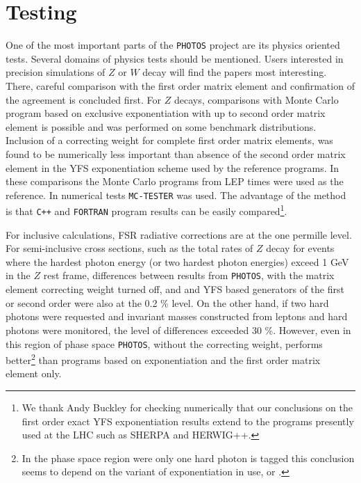 \documentclass[]{Photos_interface_design}
\begin{document}
\section{Testing}
\label{sec:tests} 
One of the most important parts of the {\tt PHOTOS} project are its physics oriented tests.
Several domains
of physics tests should be mentioned. Users interested in precision 
simulations of $Z$ or $W$ decay  will 
find  the papers \cite{Nanava:2009vg,Golonka:2006tw,Golonka:2005pn}
most interesting. There, careful comparison with the first order matrix element 
and confirmation of the agreement is concluded first.
For $Z$ decays, comparisons  with Monte Carlo program based on exclusive 
exponentiation with up to second order matrix element
is possible and was performed on some benchmark distributions.
Inclusion of a correcting weight for complete first order matrix elements, was found to be numerically less important
than absence of the second order matrix element in the YFS exponentiation scheme used by the reference programs. 
In these comparisons the Monte Carlo programs from LEP times 
\cite{koralz4:1994,kkcpc:1999} were used as the reference. In numerical tests {\tt MC-TESTER} \cite{Davidson:2008ma}
was used. The advantage of the method is that {\tt C++} and {\tt FORTRAN} program
results can be easily compared\footnote{We thank Andy Buckley for checking numerically
 that our conclusions on the first order exact YFS exponentiation results extend
to the programs presently used at the LHC such as  
SHERPA and HERWIG++.  }.
 
For inclusive calculations, FSR radiative corrections are at the one permille level.
For semi-inclusive cross sections, such as the total rates of $Z$ decay for events
where the hardest photon energy (or two hardest photon energies)   exceed 1 GeV in the $Z$ rest frame, differences
between results from {\tt PHOTOS}, with the matrix element correcting weight turned off, and
and YFS based generators of the first or second order were also 
at the 0.2 \% level. 
On the other hand, if two  hard photons were requested and invariant masses constructed from leptons
and hard photons were monitored,
 the level of differences exceeded 
 30 \%. However, even in this region of phase space {\tt PHOTOS},  without the correcting
weight, performs better\footnote{In 
  the phase space region were only one hard photon is tagged this conclusion seems to depend
  on the variant of exponentiation in use, \cite{koralz4:1994} or \cite{kkcpc:1999}.
                                }
than programs based on exponentiation and the first order matrix element only. 
\end{document}
